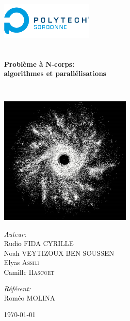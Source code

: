 \begin{titlepage}
\begin{center}

\includegraphics[width=0.35\textwidth]{./logo}~\\[1cm]

\textsc{\Large }\\[0.5cm]

\HRule \\[0.4cm]

{\huge \bfseries Problème à N-corps:\\
 algorithmes et parallélisations\\[0.4cm] }

\HRule \\[1.5cm]


\begin{center}
\includegraphics[width=0.5\textwidth]{./galaxy.jpg}~\\[1cm]
\end{center}
\begin{minipage}{0.4\textwidth}
\begin{flushleft} \large
\emph{Auteur:}\\
Rudio \textsc{FIDA CYRILLE}\\
Noah \textsc{VEYTIZOUX BEN-SOUSSEN}\\
Elyas \textsc{Assili}\\
Camille \textsc{Hascoet}
\end{flushleft}
\end{minipage}
\begin{minipage}{0.4\textwidth}
\begin{flushright} \large
\emph{Référent:} \\
Roméo \textsc{MOLINA}
\end{flushright}
\end{minipage}

\vfill

{\large \today}

\end{center}
\end{titlepage}
